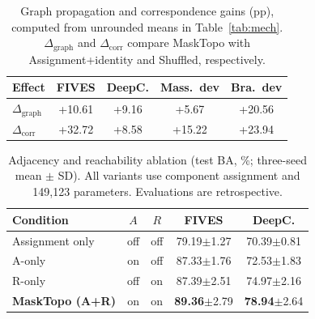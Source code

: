 \begin{table}[t]
\centering
\caption{Graph propagation and correspondence gains (pp), computed from unrounded means in Table~\ref{tab:mech}. $\Delta_{\mathrm{graph}}$ and $\Delta_{\mathrm{corr}}$ compare MaskTopo with Assignment+identity and Shuffled, respectively.}
\label{tab:effects}
\setlength{\tabcolsep}{1.2pt}
\small
\begin{tabular}{@{}lcccc@{}}
\toprule
Effect & FIVES & DeepC. & Mass.\ dev & Bra.\ dev \\
\midrule
$\Delta_{\mathrm{graph}}$ & +10.61 & +9.16 & +5.67 & +20.56 \\
$\Delta_{\mathrm{corr}}$ & +32.72 & +8.58 & +15.22 & +23.94 \\
\bottomrule
\end{tabular}
\end{table}

\begin{table}[t]
\centering
\caption{Adjacency and reachability ablation (test BA, \%; three-seed mean $\pm$ SD). All variants use component assignment and 149,123 parameters. Evaluations are retrospective.}
\label{tab:ar}
\setlength{\tabcolsep}{2.2pt}
\small
\begin{tabular}{@{}lcccc@{}}
\toprule
Condition & $A$ & $R$ & FIVES & DeepC. \\
\midrule
Assignment only & off & off & 79.19$\pm$1.27 & 70.39$\pm$0.81 \\
A-only & on & off & 87.33$\pm$1.76 & 72.53$\pm$1.83 \\
R-only & off & on & 87.39$\pm$2.51 & 74.97$\pm$2.16 \\
\textbf{MaskTopo (A+R)} & on & on & \textbf{89.36}$\pm$2.79 & \textbf{78.94}$\pm$2.64 \\
\bottomrule
\end{tabular}
\end{table}
